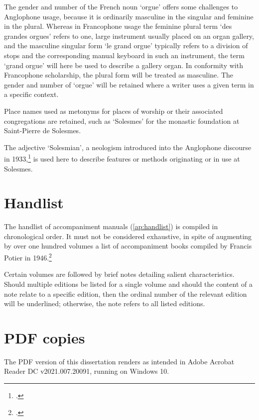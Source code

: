 The gender and number of the French noun `orgue' offers some challenges to Anglophone usage, because it is ordinarily masculine in the singular and feminine in the plural.
Whereas in Francophone usage the feminine plural term `des grandes orgues' refers to one, large instrument usually placed on an organ gallery, and the masculine singular form `le grand orgue' typically refers to a division of stops and the corresponding manual keyboard in such an instrument, the term `grand orgue' will here be used to describe a gallery organ.
In conformity with Francophone scholarship, the plural form will be treated as masculine.
The gender and number of `orgue' will be retained where a writer uses a given term in a specific context.

Place names used as metonyms for places of worship or their associated congregations are retained, such as `Solesmes' for the monastic foundation at Saint-Pierre de Solesmes.

The adjective `Solesmian', a neologism introduced into the Anglophone discourse in 1933,\footcite[p.~x]{PotironTreatiseAccompanimentGregorian1933} is used here to describe features or methods originating or in use at Solesmes.

\newpage{}
\section*{Handlist}
The handlist of accompaniment manuals (\cref{ap:handlist}) is compiled in chronological order.
It must not be considered exhaustive, in spite of augmenting by over one hundred volumes a list of accompaniment books compiled by Francis Potier in 1946.\footcite[pp.~68--98]{Potierartaccompagnementchant1946}

Certain volumes are followed by brief notes detailing salient characteristics.
Should multiple editions be listed for a single volume and should the content of a note relate to a specific edition, then the ordinal number of the relevant edition will be underlined; otherwise, the note refers to all listed editions.

\section*{PDF copies}
The PDF version of this dissertation renders as intended in Adobe Acrobat Reader DC v2021.007.20091, running on Windows 10.
